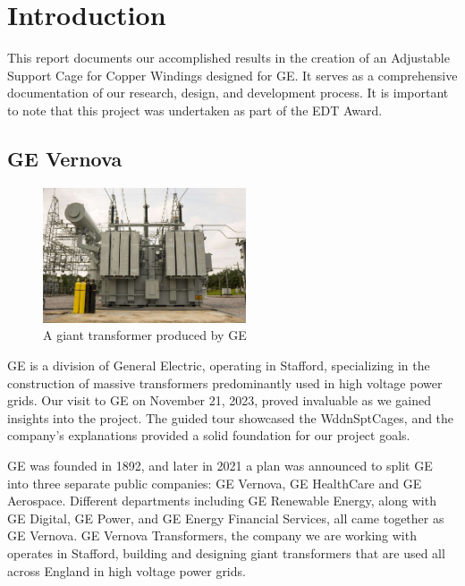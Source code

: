 \documentclass[a4paper,10pt]{article}
\begin{document}

\section{Introduction}
This report documents our accomplished results in the creation of an Adjustable Support Cage for Copper Windings designed for \gls{GE}. It serves as a comprehensive documentation of our research, design, and development process. It is important to note that this project was undertaken as part of the \gls{EDT} Award.

\subsection{GE Vernova}
\begin{figure}[H]
  \centering
  \includegraphics[width=6cm]{giant-transformer}
  \caption{A giant transformer produced by \gls{GE}}
  \label{fig:giant-transformer}
\end{figure}

\gls{GE} is a division of General Electric, operating in Stafford, specializing in the construction of massive transformers predominantly used in high voltage power grids. Our visit to \gls{GE} on November 21, 2023, proved invaluable as we gained insights into the project. The guided tour showcased the \gls{WddnSptCages}, and the company's explanations provided a solid foundation for our project goals.

\gls{GE} was founded in 1892, and later in 2021 a plan was announced to split GE into three separate public companies: GE Vernova, GE HealthCare and GE Aerospace. Different departments including GE Renewable Energy, along with GE Digital, GE Power, and GE Energy Financial Services, all came together as GE Vernova. GE Vernova Transformers, the company we are working with operates in Stafford, building and designing giant transformers that are used all across England in high voltage power grids.
\end{document}
